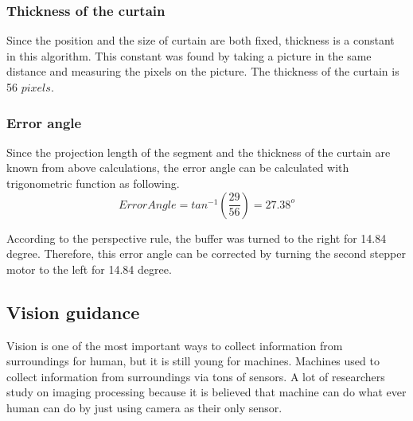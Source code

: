 \documentclass[letterpaper,12pt,oneside]{book}
\begin{document}
		\subsubsection{Thickness of the curtain}
			
		Since the position and the size of curtain are both fixed, thickness is a constant in this algorithm. This constant was found by taking a picture in the same distance and measuring the pixels on the picture. The thickness of the curtain is 56 $pixels$.
			
		\subsubsection{Error angle}
			
		Since the projection length of the segment and the thickness of the curtain are known from above calculations, the error angle can be calculated with trigonometric function as following.
		\begin{equation}
			Error Angle = tan^{-1}(\frac{29}{56}) = 27.38^o
		\end{equation}

		According to the perspective rule, the buffer was turned to the right for 14.84 degree. Therefore, this error angle can be corrected by turning the second stepper motor to the left for 14.84 degree. 
		
		\subsection{Vision guidance}
		Vision is one of the most important ways to collect information from surroundings for human, but it is still young for machines. Machines used to collect information from surroundings via tons of sensors. A lot of researchers study on imaging processing because it is believed that machine can do what ever human can do by just using camera as their only sensor. 
		
\end{document}
